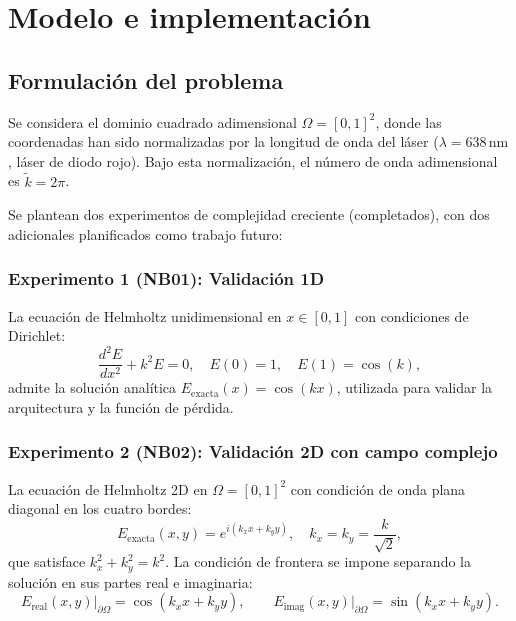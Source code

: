 \chapter{Modelo e implementación}\label{cap3:modelo}

\section{Formulación del problema}

Se considera el dominio cuadrado adimensional $\Omega = [0,1]^2$, donde las
coordenadas han sido normalizadas por la longitud de onda del láser
($\lambda = 638\,\mathrm{nm}$, láser de diodo rojo). Bajo esta normalización,
el número de onda adimensional es $\tilde{k} = 2\pi$.

Se plantean dos experimentos de complejidad creciente (completados), con dos adicionales planificados como trabajo futuro:

\subsection{Experimento 1 (NB01): Validación 1D}

La ecuación de Helmholtz unidimensional en $x \in [0,1]$ con condiciones de
Dirichlet:
%
\begin{equation}
    \frac{d^2 E}{dx^2} + k^2 E = 0, \quad
    E(0) = 1, \quad E(1) = \cos(k),
    \label{eq:helmholtz1d}
\end{equation}
%
admite la solución analítica $E_\text{exacta}(x) = \cos(kx)$, utilizada para
validar la arquitectura y la función de pérdida.

\subsection{Experimento 2 (NB02): Validación 2D con campo complejo}

La ecuación de Helmholtz 2D en $\Omega = [0,1]^2$ con condición de onda plana
diagonal en los cuatro bordes:
%
\begin{equation}
    E_\text{exacta}(x,y) = e^{i(k_x x + k_y y)}, \quad
    k_x = k_y = \frac{k}{\sqrt{2}},
    \label{eq:solucion2d}
\end{equation}
%
que satisface $k_x^2 + k_y^2 = k^2$. La condición de frontera se impone
separando la solución en sus partes real e imaginaria:
%
\begin{equation}
    E_\text{real}(x,y)\big|_{\partial\Omega} = \cos(k_x x + k_y y), \qquad
    E_\text{imag}(x,y)\big|_{\partial\Omega} = \sin(k_x x + k_y y).
\end{equation}

